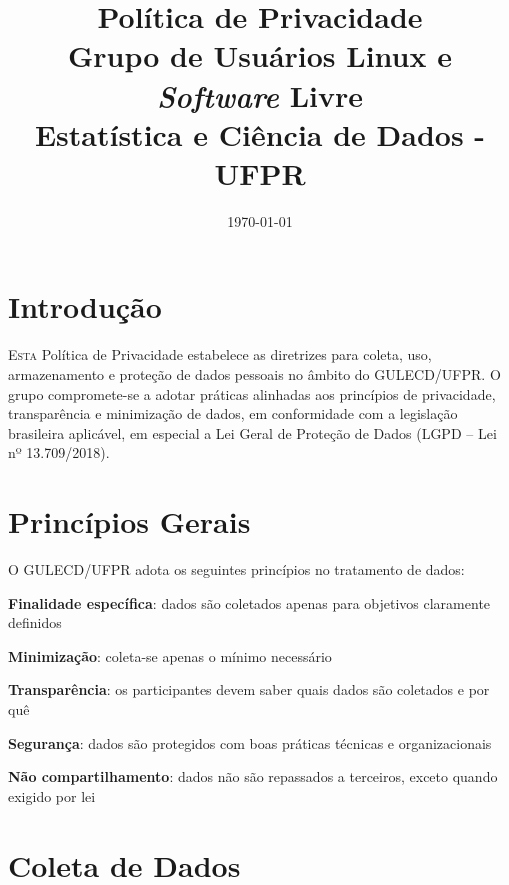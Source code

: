 \documentclass[
  12pt,          %
  a4paper,       %
  oneside,       %
  brazil         %
]{article}
\title{Política de Privacidade\\[0.3em]
  \Large\mdseries\color{gulecdGray}%
  Grupo de Usuários Linux e \textit{Software} Livre\\Estatística e Ciência de Dados - UFPR}
\date{\today}
\begin{document}
\thispagestyle{empty}
\maketitle

\newpage

\section{Introdução}

\lettrine[lines=3, lhang=0.1, nindent=0em, slope=-0.5em]{E}{sta} Política de Privacidade estabelece as diretrizes para coleta, uso, armazenamento
 e proteção de dados pessoais no âmbito do GULECD/UFPR.
O grupo compromete-se a adotar práticas alinhadas aos princípios de privacidade, transparência e minimização de dados, em conformidade com a legislação brasileira aplicável,
em especial a Lei Geral de Proteção de Dados (LGPD – Lei nº 13.709/2018).

\section{Princípios Gerais}

O GULECD/UFPR adota os seguintes princípios no tratamento de dados:

\begin{privacidade}
	\item \textbf{Finalidade específica}: dados são coletados apenas para objetivos claramente definidos
	\item \textbf{Minimização}: coleta-se apenas o mínimo necessário
	\item \textbf{Transparência}: os participantes devem saber quais dados são coletados e por quê
	\item \textbf{Segurança}: dados são protegidos com boas práticas técnicas e organizacionais
	\item \textbf{Não compartilhamento}: dados não são repassados a terceiros, exceto quando exigido por lei
\end{privacidade}

\section{Coleta de Dados}
\end{document}
